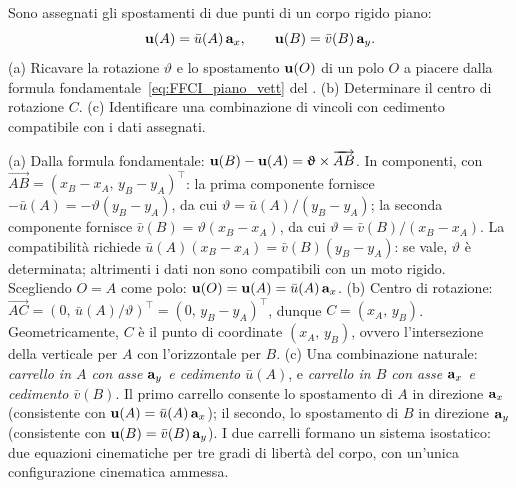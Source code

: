 \begin{esercizio}
	\label{ex:C04_identificazione}
	
	Sono assegnati gli spostamenti di due punti di un corpo rigido piano:
	\begin{equation*}
		\mathbf{u}(A) = \bar{u}(A)\,\mathbf{a}_x, \qquad
		\mathbf{u}(B) = \bar{v}(B)\,\mathbf{a}_y.
	\end{equation*}
	(a) Ricavare la rotazione $\vartheta$ e lo spostamento $\mathbf{u}(O)$ di un polo $O$ a piacere dalla formula fondamentale~\eqref{eq:FFCI_piano_vett} del .
	(b) Determinare il centro di rotazione $C$.
	(c) Identificare una combinazione di vincoli con cedimento compatibile con i dati assegnati.
	
	\risultato (a) Dalla formula fondamentale: $\mathbf{u}(B) - \mathbf{u}(A) = \bm{\upvartheta} \times \overrightarrow{AB}$. In componenti, con $\overrightarrow{AB} = (x_B - x_A,\,y_B - y_A)^\top$: la prima componente fornisce $-\bar{u}(A) = -\vartheta(y_B - y_A)$, da cui $\vartheta = \bar{u}(A)/(y_B - y_A)$; la seconda componente fornisce $\bar{v}(B) = \vartheta(x_B - x_A)$, da cui $\vartheta = \bar{v}(B)/(x_B - x_A)$. La compatibilità richiede $\bar{u}(A)(x_B - x_A) = \bar{v}(B)(y_B - y_A)$: se vale, $\vartheta$ è determinata; altrimenti i dati non sono compatibili con un moto rigido. Scegliendo $O = A$ come polo: $\mathbf{u}(O) = \mathbf{u}(A) = \bar{u}(A)\,\mathbf{a}_x$. (b) Centro di rotazione: $\overrightarrow{AC} = (0,\,\bar{u}(A)/\vartheta)^\top = (0,\,y_B - y_A)^\top$, dunque $C = (x_A,\,y_B)$. Geometricamente, $C$ è il punto di coordinate $(x_A,\,y_B)$, ovvero l'intersezione della verticale per $A$ con l'orizzontale per $B$. (c) Una combinazione naturale: \textit{carrello in $A$ con asse $\mathbf{a}_y$ e cedimento $\bar{u}(A)$}, e \textit{carrello in $B$ con asse $\mathbf{a}_x$ e cedimento $\bar{v}(B)$}. Il primo carrello consente lo spostamento di $A$ in direzione $\mathbf{a}_x$ (consistente con $\mathbf{u}(A) = \bar{u}(A)\,\mathbf{a}_x$); il secondo, lo spostamento di $B$ in direzione $\mathbf{a}_y$ (consistente con $\mathbf{u}(B) = \bar{v}(B)\,\mathbf{a}_y$). I due carrelli formano un sistema isostatico: due equazioni cinematiche per tre gradi di libertà del corpo, con un'unica configurazione cinematica ammessa.
	
\end{esercizio}


